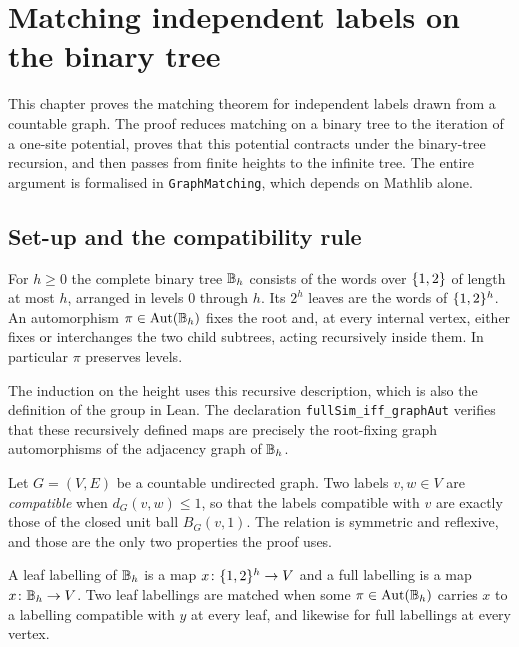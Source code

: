 \chapter{Matching independent labels on the binary tree}
\label{ch:iid}

This chapter proves the matching theorem for independent labels drawn from a countable graph.
The proof reduces matching on a binary tree to the iteration of a one-site potential, proves
that this potential contracts under the binary-tree recursion, and then passes from finite
heights to the infinite tree. The entire argument is formalised in \texttt{GraphMatching},
which depends on Mathlib alone.

\section{Set-up and the compatibility rule}

\begin{definition}
\label{def:aut}
\leanok
For $h\geq0$ the complete binary tree $\mathbb{B}_h$ consists of the words over $\{1,2\}$ of
length at most $h$, arranged in levels $0$ through $h$. Its $2^h$ leaves are the words of
$\{1,2\}^h$. An automorphism $\pi\in\operatorname{Aut}(\mathbb{B}_h)$ fixes the root and, at every internal
vertex, either fixes or interchanges the two child subtrees, acting recursively inside
them. In particular $\pi$ preserves levels.
\end{definition}

The induction on the height uses this recursive description, which is also the definition of the
group in Lean. The declaration \texttt{fullSim\_iff\_graphAut} verifies that these recursively
defined maps are precisely the root-fixing graph automorphisms of the adjacency graph of
$\mathbb{B}_h$.

\begin{definition}[Compatibility]
\label{def:compat}
\leanok
Let $G=(V,E)$ be a countable undirected graph. Two labels $v,w\in V$ are \emph{compatible}
when $d_G(v,w)\leq1$, so that the labels compatible with $v$ are exactly those of the
closed unit ball $B_G(v,1)$. The relation is symmetric and reflexive, and those are the
only two properties the proof uses.
\end{definition}

\begin{definition}
\label{def:matching}
\leanok
{}
A leaf labelling of $\mathbb{B}_h$ is a map $x\colon\{1,2\}^h\to V$ and a full labelling is a
map $x\colon\mathbb{B}_h\to V$. Two leaf labellings are matched when some $\pi\in\operatorname{Aut}(\mathbb{B}_h)$
carries $x$ to a labelling compatible with $y$ at every leaf, and likewise for full
labellings at every vertex.
\end{definition}

